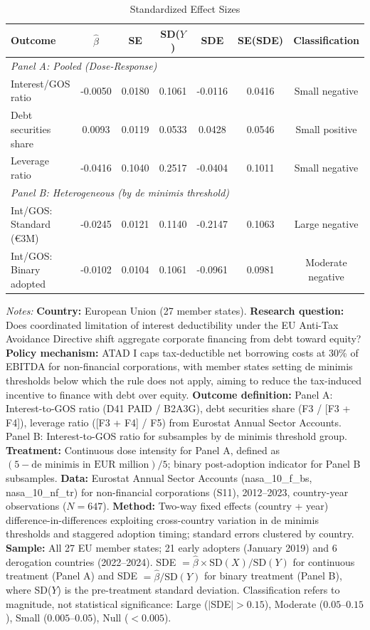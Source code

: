 \begin{table}[t]
\centering
\caption{Standardized Effect Sizes}
\label{tab:sde}
\small
\begin{tabular}{lcccccc}
\toprule
Outcome & $\hat{\beta}$ & SE & SD($Y$) & SDE & SE(SDE) & Classification \\
\midrule
\multicolumn{7}{l}{\textit{Panel A: Pooled (Dose-Response)}} \\[3pt]
Interest/GOS ratio & -0.0050 & 0.0180 & 0.1061 & -0.0116 & 0.0416 & Small negative \\
Debt securities share & 0.0093 & 0.0119 & 0.0533 & 0.0428 & 0.0546 & Small positive \\
Leverage ratio & -0.0416 & 0.1040 & 0.2517 & -0.0404 & 0.1011 & Small negative \\
\midrule
\multicolumn{7}{l}{\textit{Panel B: Heterogeneous (by de minimis threshold)}} \\[3pt]
Int/GOS: Standard (\euro{}3M) & -0.0245 & 0.0121 & 0.1140 & -0.2147 & 0.1063 & Large negative \\
Int/GOS: Binary adopted & -0.0102 & 0.0104 & 0.1061 & -0.0961 & 0.0981 & Moderate negative \\
\bottomrule
\end{tabular}
\begin{tablenotes}
\item \textit{Notes:} \textbf{Country:} European Union (27 member states). \textbf{Research question:} Does coordinated limitation of interest deductibility under the EU Anti-Tax Avoidance Directive shift aggregate corporate financing from debt toward equity? \textbf{Policy mechanism:} ATAD I caps tax-deductible net borrowing costs at 30\% of EBITDA for non-financial corporations, with member states setting de minimis thresholds below which the rule does not apply, aiming to reduce the tax-induced incentive to finance with debt over equity. \textbf{Outcome definition:} Panel A: Interest-to-GOS ratio (D41 PAID / B2A3G), debt securities share (F3 / [F3 + F4]), leverage ratio ([F3 + F4] / F5) from Eurostat Annual Sector Accounts. Panel B: Interest-to-GOS ratio for subsamples by de minimis threshold group. \textbf{Treatment:} Continuous dose intensity for Panel A, defined as $(5 - \text{de minimis in EUR million})/5$; binary post-adoption indicator for Panel B subsamples. \textbf{Data:} Eurostat Annual Sector Accounts (nasa\_10\_f\_bs, nasa\_10\_nf\_tr) for non-financial corporations (S11), 2012--2023, country-year observations ($N = 647$). \textbf{Method:} Two-way fixed effects (country + year) difference-in-differences exploiting cross-country variation in de minimis thresholds and staggered adoption timing; standard errors clustered by country. \textbf{Sample:} All 27 EU member states; 21 early adopters (January 2019) and 6 derogation countries (2022--2024). SDE $= \hat{\beta} \times \text{SD}(X) / \text{SD}(Y)$ for continuous treatment (Panel A) and SDE $= \hat{\beta} / \text{SD}(Y)$ for binary treatment (Panel B), where SD($Y$) is the pre-treatment standard deviation. Classification refers to magnitude, not statistical significance: Large ($|$SDE$| > 0.15$), Moderate ($0.05$--$0.15$), Small ($0.005$--$0.05$), Null ($< 0.005$).
\end{tablenotes}
\end{table}

